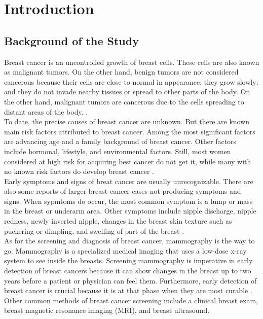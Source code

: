 \section{Introduction}
\setcounter{page}{1}
\subsection{Background of the Study}
\qquad Breast cancer is an uncontrolled growth of breast cells. These cells are also known as malignant tumors. On the other hand, benign tumors are not considered cancerous because their cells are close to normal in appearance; they grow slowly; and they do not invade nearby tissues or spread to other parts of the body. On the other hand, malignant tumors are cancerous due to the cells spreading to distant areas of the body. \cite{breastCancer}. \\

	To date, the precise causes of breast cancer are unknown. But there are known main risk factors attributed to breast cancer. Among the most significant factors are advancing age and a family background of breast cancer. Other factors include hormonal, lifestyle, and environmental factors. Still, most women considered at high risk for acquiring best cancer do not get it, while many with no known risk factors do develop breast cancer \cite{cause}. \\

	Early symptoms and signs of breat cancer are usually unrecognizable. There are also some reports of larger breast cancer cases not producing symptoms and signs. When sypmtoms do occur, the most common symptom is a lump or mass in the breast or underarm area. Other symptoms include nipple discharge, nipple redness, newly inverted nipple, changes in the breast skin texture such as puckering or dimpling, and swelling of part of the breast \cite{symptoms}. \\

	As for the screening and diagnosis of breast cancer, mammography is the way to go. Mammography is a specialized medical imaging that uses a low-dose x-ray system to see inside the breasts. Screening mammography is imperative in early detection of breast cancers because it can show changes in the breast up to two years before a patient or physician can feel them. Furthermore, early detection of breast cancer is crucial because it is at that phase when they are most curable \cite{screeningMammography}. Other common methods of breast cancer screening include a clinical breast exam, breast magnetic resonance imaging (MRI), and breast ultrasound. \\

